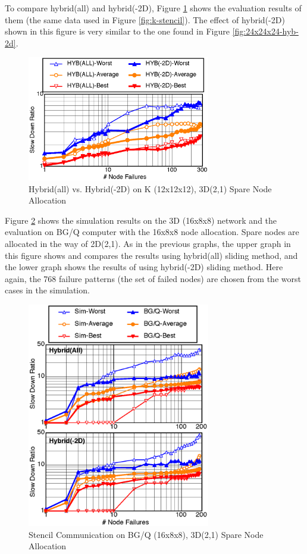 \documentclass[Afour,times,sagev]{sagej}
\begin{document}
To compare hybrid(all) and hybrid(-2D), Figure \ref{fig:k-comparison}
shows the evaluation results of them (the same data used in Figure
\ref{fig:k-stencil}). The effect of hybrid(-2D) shown in this figure
is very similar to the one found in Figure \ref{fig:24x24x24-hyb-2d}. 

\begin{figure}[ht]
\centering
\includegraphics[width=80mm]{Figs/K-comparison-CL.eps}
  \caption{Hybrid(all) vs. Hybrid(-2D) on K (12x12x12), 3D(2,1) Spare Node
    Allocation}
  \label{fig:k-comparison}
\end{figure}

Figure \ref{fig:bgq-stencil} shows the simulation results on the
3D (16x8x8) network and the evaluation on BG/Q computer with the 16x8x8
node allocation. Spare nodes are allocated in the way of
2D(2,1). As in the previous graphs, the upper graph in this figure
shows and compares the results using hybrid(all) sliding method, and
the lower graph shows the results of using hybrid(-2D) sliding
method. Here again, the 768 failure patterns (the set of failed nodes)
are chosen from the worst cases in the simulation.

\begin{figure}[ht]
\centering
\includegraphics[width=80mm]{Figs/BGQ-Stencil-CL.eps}
  \caption{Stencil Communication on BG/Q (16x8x8), 3D(2,1) Spare Node
    Allocation}
  \label{fig:bgq-stencil}
\end{figure}
\end{document}
